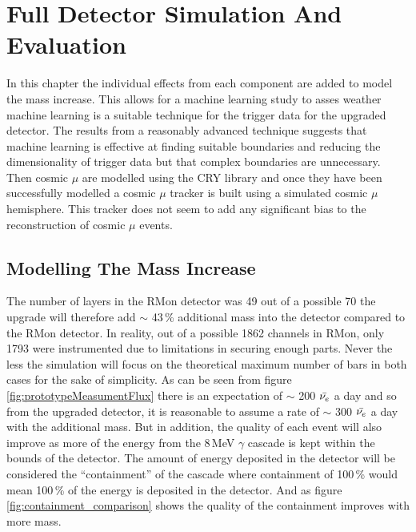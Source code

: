 
\chapter{Full Detector Simulation And Evaluation}\label{chp:DataAnalysisTechniques}

In this chapter the individual effects from each component are added to model the mass increase. This allows for a machine learning study to asses weather machine learning is a suitable technique for the trigger data for the upgraded detector. The results from a reasonably advanced technique suggests that machine learning is effective at finding suitable boundaries and reducing the dimensionality of trigger data but that complex boundaries are unnecessary. Then cosmic $\mu$ are modelled using the CRY library \cite{ieee_cry_2007} and once they have been successfully modelled a cosmic $\mu$ tracker is built using a simulated cosmic $\mu$ hemisphere. This tracker does not seem to add any significant bias to the reconstruction of cosmic $\mu$ events.

\section{Modelling The Mass Increase}
The number of layers in the RMon detector was 49 out of a possible 70 the upgrade will therefore add $\sim$ 43\,\% additional mass into the detector compared to the RMon detector. In reality, out of a possible 1862 channels in RMon, only 1793 were instrumented due to limitations in securing enough parts. Never the less the simulation will focus on the theoretical maximum number of bars in both cases for the sake of simplicity. As can be seen from figure \ref{fig:prototypeMeasumentFlux} there is an expectation of $\sim$ 200 $\Bar{\nu_e}$ a day and so from the upgraded detector, it is reasonable to assume a rate of $\sim$ 300 $\Bar{\nu_e}$ a day with the additional mass. But in addition, the quality of each event will also improve as more of the energy from the 8\,MeV $\gamma$ cascade is kept within the bounds of the detector. The amount of energy deposited in the detector will be considered the ``containment'' of the cascade where containment of 100\,\% would mean 100\,\% of the energy is deposited in the detector. And as figure \ref{fig:containment_comparison} shows the quality of the containment improves with more mass. %

